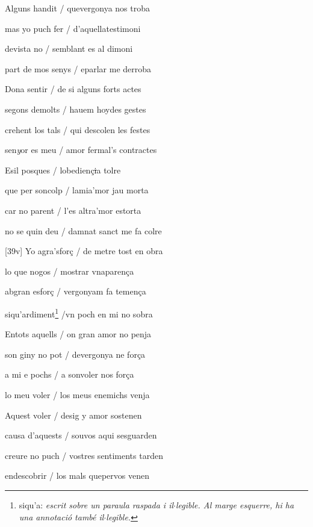 \documentclass[12pt]{article}
\begin{document}
\begin{estrofa}

 Alguns handit / quevergonya nos troba

 mas yo puch fer / d'aquellatestimoni

 devista no / semblant es al dimoni

 part de mos senys / eparlar me derroba

 Dona sentir / de si alguns forts actes

 segons demolts / hauem hoydes gestes

 crehent los tals / qui descolen les festes

 sen\textit{y}or es meu / amor fermal's contractes

\end{estrofa}



\begin{estrofa}

 Esil posques / lobedien\c{c}\sout{i}a tolre

 que per soncolp / lamia'mor jau morta

 car no parent / l'es altra'mor estorta

 no se quin deu / damnat sanct me fa colre

 [39v] Yo agra'sfor\c{c} / de metre tost en obra

 lo que nogos / mostrar vnaparen\c{c}a

 abgran esfor\c{c} / vergonyam fa temen\c{c}a

 siqu'ardiment\footnote{siqu'a:\textit{ escrit sobre un paraula raspada i
il$\cdot{}$legible. Al marge esquerre, hi ha una annotaci\'{o} tamb\'{e}
il$\cdot{}$legible.}} /vn poch en mi no sobra

\end{estrofa}



\begin{estrofa}

 Entots aquells / on gran amor no penja

 son giny no pot / devergonya ne for\c{c}a

 a mi e pochs / a sonvoler nos for\c{c}a

 lo meu voler / los meus enemichs venja

 Aquest voler / desig y amor sostenen

 causa d'aquests / souvos aqui sesguarden

 creure no puch / vostres sentiments tarden

 endescobrir / los mals quepervos venen

\end{estrofa}
\end{document}
